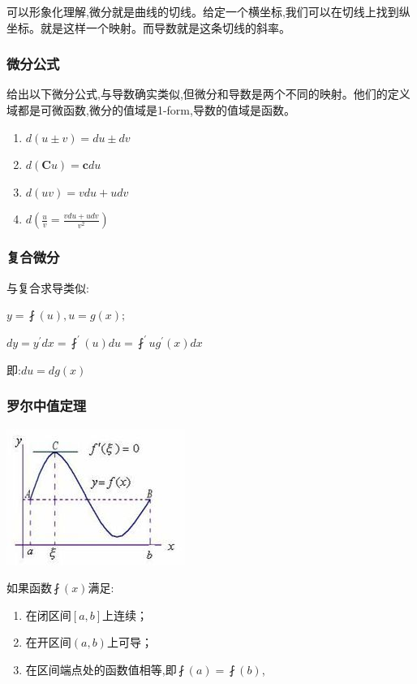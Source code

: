 \documentclass[UTF8]{ctexbook}
\newcommand{\derivative}{^\prime}
\begin{document}
{{{可以形象化理解,微分就是曲线的切线。给定一个横坐标,我们可以在切线上找到纵坐标。就是这样一个映射。而导数就是这条切线的斜率。

\subsubsection{微分公式}{
  给出以下微分公式,与导数确实类似,但微分和导数是两个不同的映射。他们的定义域都是可微函数,微分的值域是1-form,导数的值域是函数。
  \begin{enumerate}
    \item $d(u \pm v) = du \pm dv$
    \item $d(\mathbf{C}u) = \mathbf{c}du$
    \item $d(uv) = vdu + udv$
    \item $d(\frac{u}{v} = \frac{vdu + udv}{v^2})$
  \end{enumerate}
}%

\subsubsection{复合微分}{
  与复合求导类似:

  $y = \fint(u), u = g(x);$

  $dy = y\derivative dx = \fint\derivative(u)du = \fint\derivative{u}g\derivative(x)dx$

  即:$du = dg(x)$
}%

\subsubsection{罗尔中值定理}{
  \includegraphics{resources/Rolle's_mean_value_theorem.jpg}

  如果函数$\fint(x)$满足:

  \begin{enumerate}
    \item 在闭区间$[a,b]$上连续；
    \item 在开区间$(a,b)$上可导；
    \item 在区间端点处的函数值相等,即$\fint(a) = \fint(b)$,
  \end{enumerate}

}}}}
\end{document}
